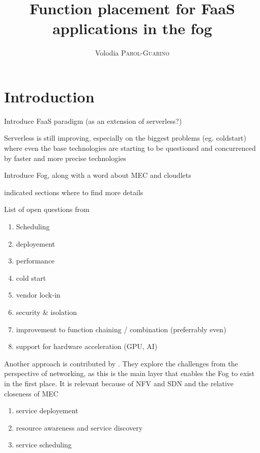 \documentclass[11pt]{sdm}
\title{Function placement for FaaS applications in the fog}
\author{Volodia \textsc{Parol-Guarino}}
\begin{document}
\maketitle


\section{Introduction}
\begin{itemize}
	\item Introduce \gls{FaaS} paradigm (as an extension of serverless?)
 	\item Serverless is still improving, especially on the biggest problems (eg. coldstart) where even the base technologies are starting to be questioned and concurrenced by faster and more precise technologies \citet{hykes_solomon_2019}
    \item Introduce Fog, along with a word about \gls{MEC} and cloudlets
    \item indicated sections where to find more details
    \item {List of open questions from \citet{kjorveziroski_iot_2021}
    \begin{enumerate}
        \item Scheduling
        \item deployement
        \item performance
        \item cold start
        \item vendor lock-in
        \item security \& isolation
        \item improvement to function chaining / combination (preferrably even)
        \item support for hardware acceleration (GPU, AI)
    \end{enumerate}
    \item { Another approach is contributed by \citet{xie_when_2021}. They explore the challenges from the perspective of networking, as this is the main layer that enables the Fog to exist in the first place. It is relevant because of \gls{NFV} and \gls{SDN} and the relative closeness of \gls{MEC}
    \begin{enumerate}
        \item service deployement
        \item resource awareness and service discovery
        \item service scheduling

\end{enumerate}}}
\end{itemize}
\end{document}
